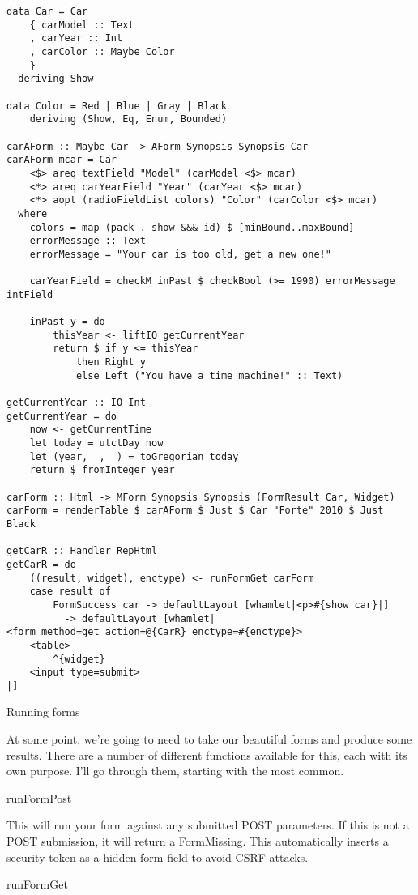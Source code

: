 \begin{lstlisting}
data Car = Car
    { carModel :: Text
    , carYear :: Int
    , carColor :: Maybe Color
    }
  deriving Show

data Color = Red | Blue | Gray | Black
    deriving (Show, Eq, Enum, Bounded)

carAForm :: Maybe Car -> AForm Synopsis Synopsis Car
carAForm mcar = Car
    <$> areq textField "Model" (carModel <$> mcar)
    <*> areq carYearField "Year" (carYear <$> mcar)
    <*> aopt (radioFieldList colors) "Color" (carColor <$> mcar)
  where
    colors = map (pack . show &&& id) $ [minBound..maxBound]
    errorMessage :: Text
    errorMessage = "Your car is too old, get a new one!"

    carYearField = checkM inPast $ checkBool (>= 1990) errorMessage intField

    inPast y = do
        thisYear <- liftIO getCurrentYear
        return $ if y <= thisYear
            then Right y
            else Left ("You have a time machine!" :: Text)

getCurrentYear :: IO Int
getCurrentYear = do
    now <- getCurrentTime
    let today = utctDay now
    let (year, _, _) = toGregorian today
    return $ fromInteger year

carForm :: Html -> MForm Synopsis Synopsis (FormResult Car, Widget)
carForm = renderTable $ carAForm $ Just $ Car "Forte" 2010 $ Just Black

getCarR :: Handler RepHtml
getCarR = do
    ((result, widget), enctype) <- runFormGet carForm
    case result of
        FormSuccess car -> defaultLayout [whamlet|<p>#{show car}|]
        _ -> defaultLayout [whamlet|
<form method=get action=@{CarR} enctype=#{enctype}>
    <table>
        ^{widget}
    <input type=submit>
|]
\end{lstlisting}

Running forms

At some point, we're going to need to take our beautiful forms and produce some results. There are a number of different functions available for this, each with its own purpose. I'll go through them, starting with the most common.

runFormPost

This will run your form against any submitted POST parameters. If this is not a POST submission, it will return a FormMissing. This automatically inserts a security token as a hidden form field to avoid CSRF attacks.

runFormGet

